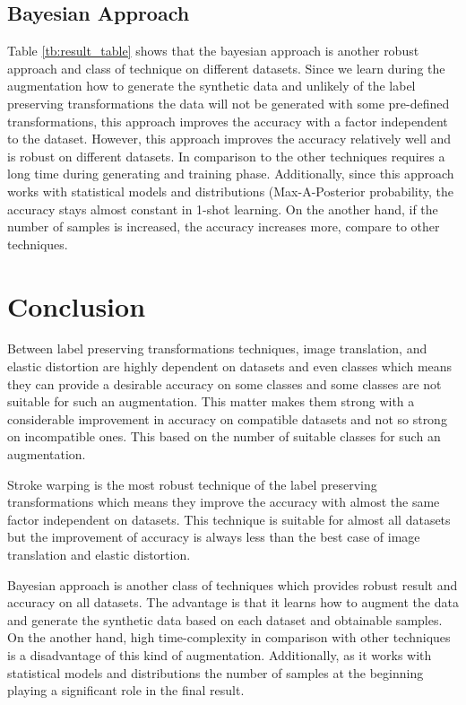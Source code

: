 \subsection{Bayesian Approach}
Table \ref{tb:result_table} shows that the bayesian approach is
another robust approach and class of technique on different datasets. Since we learn during the
augmentation how to generate the synthetic data and unlikely of the label preserving transformations
the data will not be generated with some pre-defined transformations, this approach improves the
accuracy with a factor independent to the dataset. However, this approach improves the accuracy
relatively well and is robust on different datasets. In comparison to the other techniques requires
a long time during generating and training phase. Additionally, since this approach works with
statistical models and distributions (Max-A-Posterior probability, the accuracy stays almost constant in
1-shot learning. On the another hand, if the number of samples is increased, the accuracy
increases more, compare to other techniques.

\section{Conclusion}
Between label preserving transformations techniques, image translation, and elastic distortion are highly dependent on datasets and even classes which means they can provide a desirable accuracy on some classes and some classes are not suitable for such an augmentation. This matter makes them strong with a considerable improvement in accuracy on compatible datasets and not so strong on incompatible ones. This based on the number of suitable classes for such an augmentation.

Stroke warping is the most robust technique of the label preserving transformations which means they improve the accuracy with almost the same factor independent on datasets. This technique is suitable for almost all datasets but the improvement of accuracy is always less than the best case of image translation and elastic distortion.

Bayesian approach is another class of techniques which provides robust result and accuracy on all
datasets. The advantage is that it learns how to augment the data and generate the synthetic data
based on each dataset and obtainable samples. On the another hand, high time-complexity in comparison
with other techniques is a disadvantage of this kind of augmentation. Additionally, as it works with
statistical models and distributions the number of samples at the beginning playing a significant
role in the final result.

